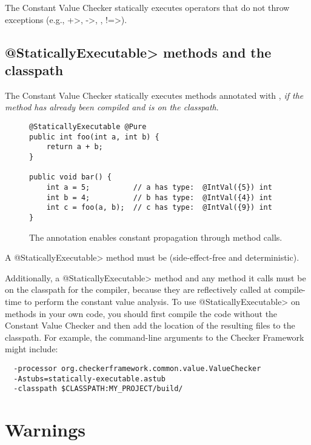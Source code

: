 The Constant Value Checker statically executes operators that do
not throw exceptions (e.g., \<+>, \<->, \code{<\relax<}, \<!=>).


\subsection{\<@StaticallyExecutable> methods and the classpath\label{constant-value-staticallyexecutable-annotation}}

The Constant Value Checker statically executes methods annotated with
, \emph{if the
method has already been compiled and is on the classpath}.

\begin{figure}
\begin{Verbatim}
@StaticallyExecutable @Pure
public int foo(int a, int b) {
    return a + b;
}

public void bar() {
    int a = 5;          // a has type:  @IntVal({5}) int
    int b = 4;          // b has type:  @IntVal({4}) int
    int c = foo(a, b);  // c has type:  @IntVal({9}) int
}
\end{Verbatim}
\caption{The
   annotation enables
  constant propagation through method calls.}
\label{fig-staticallyexecutable}
\end{figure}

A \<@StaticallyExecutable> method must
be  (side-effect-free and
deterministic).

Additionally, a \<@StaticallyExecutable> method and any method it calls must be on
the classpath for the compiler, because they are reflectively called at
compile-time to perform the constant value analysis.
To use \<@StaticallyExecutable> on methods in your own code, you should
first compile the code without the Constant Value Checker and then add
the location of the resulting  files to the
classpath. For example, the command-line arguments to the Checker Framework
might include:
\begin{Verbatim}
  -processor org.checkerframework.common.value.ValueChecker
  -Astubs=statically-executable.astub
  -classpath $CLASSPATH:MY_PROJECT/build/
\end{Verbatim}


\section{Warnings\label{value-checker-warnings}}

